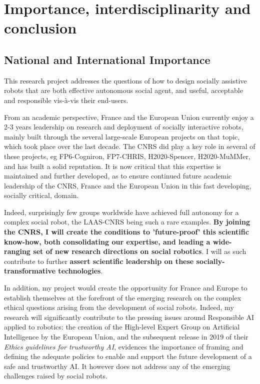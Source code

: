 
\vspace{3em}
\section{Importance, interdisciplinarity and conclusion}



\subsection{National and International Importance}

This research project addresses the questions of how to design socially
assistive robots that are both effective autonomous social agent, and useful,
acceptable and responsible vis-à-vis their end-users.

From an academic perspective, France and the European Union currently enjoy a
2-3 years leadership on research and deployment of socially interactive robots,
mainly built through the several large-scale European projects on that topic,
which took place over the last decade. The CNRS did
play a key role in several of these projects, eg FP6-Cogniron, FP7-CHRIS,
H2020-Spencer, H2020-MuMMer, and has built a solid reputation. It is now
critical that this expertise is maintained and further developed, as to ensure
continued future academic leadership of the CNRS, France and the European Union
in this fast developing, socially critical, domain.

Indeed, surprisingly few groups worldwide have achieved full autonomy for a complex
social robot, the LAAS-CNRS being such a rare examples. \textbf{By joining the CNRS, I
will create the conditions to 'future-proof' this scientific know-how, both
consolidating our expertise, and leading a wide-ranging set of new research
directions on social robotics}. I will as such contribute to further
\textbf{assert scientific leadership on these socially-transformative technologies}.

In addition, my project would create the opportunity for France and Europe to
establish themselves at the forefront of the emerging research on the complex
ethical questions arising from the development of social robots. Indeed, my
research will significantly contribute to the pressing issues around Responsible
AI applied to robotics: the creation of the High-level Expert Group on
Artificial Intelligence by the European Union, and the subsequent release in
2019 of their \emph{Ethics guidelines for trustworthy AI}, evidences the
importance of framing and defining the adequate policies to enable and support
the future development of a safe and trustworthy AI. It however does not address
any of the emerging challenges raised by social robots.

